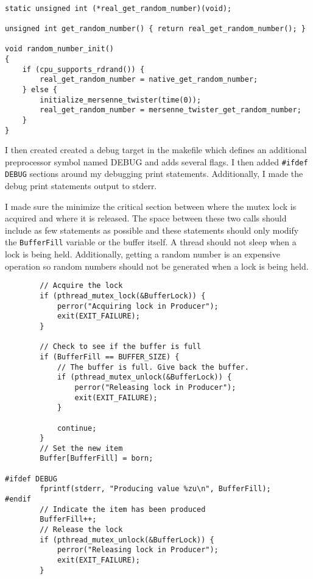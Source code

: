 \documentclass[10pt,conference,draftclsnofoot,onecolumn]{IEEEtran}
\begin{document}
\begin{lstlisting}

static unsigned int (*real_get_random_number)(void);

unsigned int get_random_number() { return real_get_random_number(); }

void random_number_init()
{
	if (cpu_supports_rdrand()) {
		real_get_random_number = native_get_random_number;
	} else {
		initialize_mersenne_twister(time(0));
		real_get_random_number = mersenne_twister_get_random_number;
	}
}
\end{lstlisting}

I then created created a debug target in the makefile which defines an additional preprocessor symbol named DEBUG and adds several flags. I then added \texttt{\#ifdef DEBUG} sections around my debugging print statements. Additionally, I made the debug print statements output to stderr.

I made sure the minimize the critical section between where the mutex lock is acquired and where it is released. The space between these two calls should include as few statements as possible and these statements should only modify the \texttt{BufferFill} variable or the buffer itself. A thread should not sleep when a lock is being held. Additionally, getting a random number is an expensive operation so random numbers should not be generated when a lock is being held.

\begin{lstlisting}
		// Acquire the lock
		if (pthread_mutex_lock(&BufferLock)) {
			perror("Acquiring lock in Producer");
			exit(EXIT_FAILURE);
		}

		// Check to see if the buffer is full
		if (BufferFill == BUFFER_SIZE) {
			// The buffer is full. Give back the buffer.
			if (pthread_mutex_unlock(&BufferLock)) {
				perror("Releasing lock in Producer");
				exit(EXIT_FAILURE);
			}

			continue;
		}
		// Set the new item
		Buffer[BufferFill] = born;

#ifdef DEBUG
		fprintf(stderr, "Producing value %zu\n", BufferFill);
#endif
		// Indicate the item has been produced
		BufferFill++;
		// Release the lock
		if (pthread_mutex_unlock(&BufferLock)) {
			perror("Releasing lock in Producer");
			exit(EXIT_FAILURE);
		}

\end{lstlisting}
\end{document}
